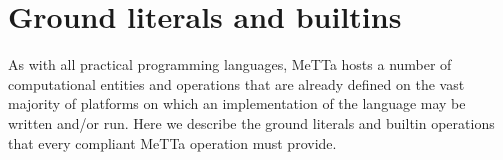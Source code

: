 \section{Ground literals and builtins}
As with all practical programming languages, MeTTa hosts a number of computational entities and operations that are already defined on the vast majority of platforms on which an implementation of the language may be written and/or run. Here we describe the ground literals and builtin operations that every compliant MeTTa operation must provide.
